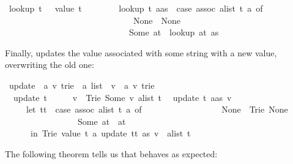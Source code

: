 \begin{isabellebody}
\isamarkupfalse%
\ {\isachardoublequote}lookup\ t\ {\isacharbrackleft}{\isacharbrackright}\ {\isacharequal}\ value\ t{\isachardoublequote}\isanewline
\ \ \ \ \ \ \ \ {\isachardoublequote}lookup\ t\ {\isacharparenleft}a{\isacharhash}as{\isacharparenright}\ {\isacharequal}\ {\isacharparenleft}case\ assoc\ {\isacharparenleft}alist\ t{\isacharparenright}\ a\ of\isanewline
\ \ \ \ \ \ \ \ \ \ \ \ \ \ \ \ \ \ \ \ \ \ \ \ \ \ \ \ \ \ None\ {\isasymRightarrow}\ None\isanewline
\ \ \ \ \ \ \ \ \ \ \ \ \ \ \ \ \ \ \ \ \ \ \ \ \ \ \ \ {\isacharbar}\ Some\ at\ {\isasymRightarrow}\ lookup\ at\ as{\isacharparenright}{\isachardoublequote}\isamarkupfalse%
%
\begin{isamarkuptext}%
Finally,  updates the value associated with some
string with a new value, overwriting the old one:%
\end{isamarkuptext}%
\isamarkuptrue%
\ update\ {\isacharcolon}{\isacharcolon}\ {\isachardoublequote}{\isacharparenleft}{\isacharprime}a{\isacharcomma}\ {\isacharprime}v{\isacharparenright}\ trie\ {\isasymRightarrow}\ {\isacharprime}a\ list\ {\isasymRightarrow}\ {\isacharprime}v\ {\isasymRightarrow}\ {\isacharparenleft}{\isacharprime}a{\isacharcomma}\ {\isacharprime}v{\isacharparenright}\ trie{\isachardoublequote}\isanewline
\isamarkupfalse%
\isanewline
\ \ {\isachardoublequote}update\ t\ {\isacharbrackleft}{\isacharbrackright}\ \ \ \ \ v\ {\isacharequal}\ Trie\ {\isacharparenleft}Some\ v{\isacharparenright}\ {\isacharparenleft}alist\ t{\isacharparenright}{\isachardoublequote}\isanewline
\ \ {\isachardoublequote}update\ t\ {\isacharparenleft}a{\isacharhash}as{\isacharparenright}\ v\ {\isacharequal}\isanewline
\ \ \ \ \ {\isacharparenleft}let\ tt\ {\isacharequal}\ {\isacharparenleft}case\ assoc\ {\isacharparenleft}alist\ t{\isacharparenright}\ a\ of\isanewline
\ \ \ \ \ \ \ \ \ \ \ \ \ \ \ \ \ \ None\ {\isasymRightarrow}\ Trie\ None\ {\isacharbrackleft}{\isacharbrackright}\ \isanewline
\ \ \ \ \ \ \ \ \ \ \ \ \ \ \ \ {\isacharbar}\ Some\ at\ {\isasymRightarrow}\ at{\isacharparenright}\isanewline
\ \ \ \ \ \ in\ Trie\ {\isacharparenleft}value\ t{\isacharparenright}\ {\isacharparenleft}{\isacharparenleft}a{\isacharcomma}\ update\ tt\ as\ v{\isacharparenright}\ {\isacharhash}\ alist\ t{\isacharparenright}{\isacharparenright}{\isachardoublequote}\isamarkupfalse%
%
\begin{isamarkuptext}%
The following theorem tells us that  behaves as
expected:%
\end{isamarkuptext}%

\end{isabellebody}
